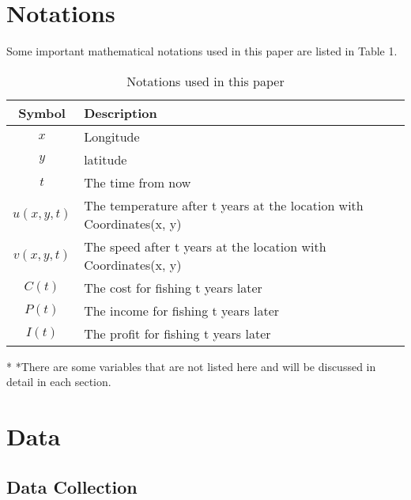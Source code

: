 \documentclass[12pt]{article}  %
\begin{document}
\section{Notations}
Some important mathematical notations used in this paper are listed in Table 1. 
\begin{table}[htbp]
\begin{center}
\caption{Notations used in this paper}
\begin{tabular}{c l}
\toprule[2pt]
\multicolumn{1}{m{3cm}}{\centering Symbol}
&\multicolumn{1}{m{8cm}}{\centering Description }\\
\midrule
$x$& Longitude \\
$y$& latitude \\
$t$& The time from now \\
$u(x,y,t)$& The temperature after t years at the location with Coordinates(x, y)\\
$v(x,y,t)$& The speed after t years at the location with Coordinates(x, y) \\
$C(t)$ & The cost for fishing t years later \\
$P(t)$ & The income for fishing t years later \\
$I(t)$ & The profit for fishing t years later \\
\bottomrule[2pt]
\end{tabular}\label{tb:notation}
 \begin{tablenotes}
        \footnotesize
        \item[*] *There are some variables that are not listed here and will be discussed in detail in each section. %
      \end{tablenotes}
\end{center}
\end{table}
\vspace{-1cm}%


\section{Data}
\subsection{Data Collection}
\end{document}
